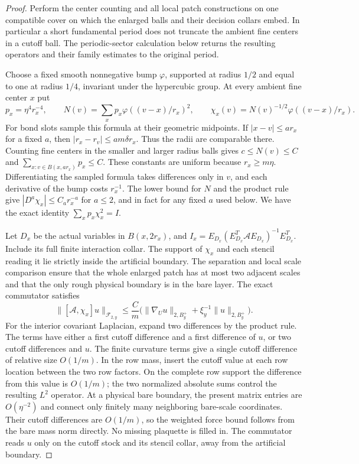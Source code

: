\documentclass[11pt,letterpaper,reqno]{amsart}
\numberwithin{equation}{section}
\theoremstyle{definition}
\theoremstyle{remark}
\begin{document}
\begin{proof}
Perform the center counting and all local patch constructions on one compatible cover on which the enlarged balls and their decision collars embed. In particular a short fundamental period does not truncate the ambient fine centers in a cutoff ball. The periodic-sector calculation below returns the resulting operators and their family estimates to the original period.

Choose a fixed smooth nonnegative bump \(\varphi\), supported at radius \(1/2\) and equal to one at radius \(1/4\), invariant under the hypercubic group. At every ambient fine center \(x\) put
\[
 p_x=\eta^4r_x^{-4},\qquad
 N(v)=\sum_x p_x\varphi((v-x)/r_x)^2,\qquad
 \chi_x(v)=N(v)^{-1/2}\varphi((v-x)/r_x).
\]
For bond slots sample this formula at their geometric midpoints. If \(|x-v|\le a r_x\) for a fixed \(a\), then \(|r_x-r_v|\le am\delta r_x\). Thus the radii are comparable there. Counting fine centers in the smaller and larger radius balls gives \(c\le N(v)\le C\) and \(\sum_{x:v\in B(x,a r_x)}p_x\le C\). These constants are uniform because \(r_x\ge m\eta\). Differentiating the sampled formula takes differences only in \(v\), and each derivative of the bump costs \(r_x^{-1}\). The lower bound for \(N\) and the product rule give \(|D^a\chi_x|\le C_a r_x^{-a}\) for \(a\le2\), and in fact for any fixed \(a\) used below. We have the exact identity \(\sum_xp_x\chi_x^2=I\).

Let \(D_x\) be the actual variables in \(B(x,2r_x)\), and \(I_x=E_{D_x}(E_{D_x}^T\mathcal A E_{D_x})^{-1}E_{D_x}^T\). Include its full finite interaction collar. The support of \(\chi_x\) and each stencil reading it lie strictly inside the artificial boundary. The separation and local scale comparison ensure that the whole enlarged patch has at most two adjacent scales and that the only rough physical boundary is in the bare layer. The exact commutator satisfies
\begin{equation}\label{mb:eq-slow-family-commutator}
 \|[\mathcal A,\chi_x]u\|_{\mathcal F_{2,y}}
          \le \frac{C}{m}\bigl(\|\nabla_Uu\|_{2,B_y^+}
                              +\xi_y^{-1}\|u\|_{2,B_y^+}\bigr).
\end{equation}
For the interior covariant Laplacian, expand two differences by the product rule. The terms have either a first cutoff difference and a first difference of \(u\), or two cutoff differences and \(u\). The finite curvature terms give a single cutoff difference of relative size \(O(1/m)\). In the row mass, insert the cutoff value at each row location between the two row factors. On the complete row support the difference from this value is \(O(1/m)\); the two normalized absolute sums control the resulting \(L^2\) operator. At a physical bare boundary, the present matrix entries are \(O(\eta^{-2})\) and connect only finitely many neighboring bare-scale coordinates. Their cutoff differences are \(O(1/m)\), so the weighted force bound follows from the bare mass norm directly. No missing plaquette is filled in. The commutator reads \(u\) only on the cutoff stock and its stencil collar, away from the artificial boundary.


\end{proof}
\end{document}
